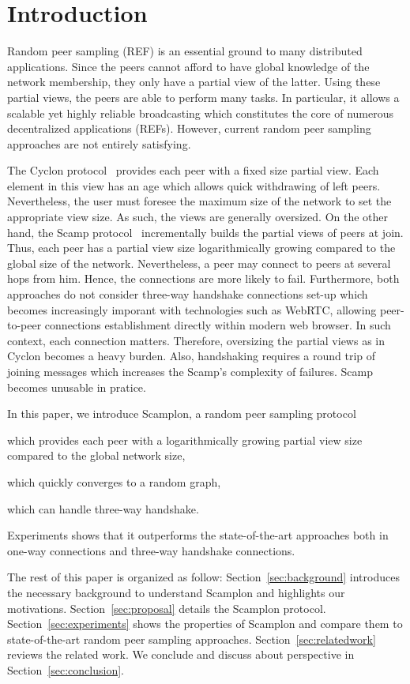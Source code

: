 
\section{Introduction}
Random peer sampling (REF) is an essential ground to many distributed
applications. Since the peers cannot afford to have global knowledge of the
network membership, they only have a partial view of the latter. Using these
partial views, the peers are able to perform many tasks. In particular, it
allows a scalable yet highly reliable broadcasting which constitutes the core
of numerous decentralized applications (REFs). However, current random peer
sampling approaches are not entirely satisfying. 

The Cyclon protocol~\cite{voulgaris2005cyclon} provides each peer with a fixed
size partial view.  Each element in this view has an age which allows quick
withdrawing of left peers. Nevertheless, the user must foresee the maximum size
of the network to set the appropriate view size. As such, the views are
generally oversized. On the other hand, the Scamp
protocol~\cite{ganesh2001scamp,ganesh2003peer} incrementally builds the partial
views of peers at join. Thus, each peer has a partial view size logarithmically
growing compared to the global size of the network. Nevertheless, a peer may
connect to peers at several hops from him. Hence, the connections are more
likely to fail.  Furthermore, both approaches do not consider three-way
handshake connections set-up which becomes increasingly imporant with
technologies such as WebRTC, allowing peer-to-peer connections establishment
directly within modern web browser. In such context, each connection
matters. Therefore, oversizing the partial views as in Cyclon becomes a heavy
burden. Also, handshaking requires a round trip of joining messages which
increases the Scamp's complexity of failures. Scamp becomes unusable in
pratice.

In this paper, we introduce Scamplon, a random peer sampling protocol
\begin{inparaenum}[(i)]
\item which provides each peer with a logarithmically growing partial view size
  compared to the global network size,
\item which quickly converges to a random graph,
\item which can handle three-way handshake.
\end{inparaenum}
Experiments shows that it outperforms the state-of-the-art approaches both in
one-way connections and three-way handshake connections.

The rest of this paper is organized as follow: Section~\ref{sec:background}
introduces the necessary background to understand Scamplon and highlights our
motivations. Section~\ref{sec:proposal} details the Scamplon protocol.
Section~\ref{sec:experiments} shows the properties of Scamplon and compare them
to state-of-the-art random peer sampling
approaches. Section~\ref{sec:relatedwork} reviews the related work. We conclude
and discuss about perspective in Section~\ref{sec:conclusion}.

